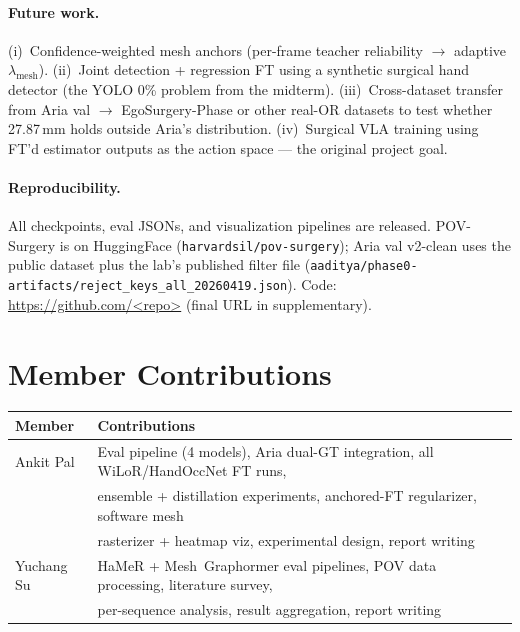 \documentclass{article}
\begin{document}
\paragraph{Future work.}
(i)~Confidence-weighted mesh anchors (per-frame teacher reliability $\to$ adaptive $\lambda_{\text{mesh}}$). (ii)~Joint detection + regression FT using a synthetic surgical hand detector (the YOLO 0\% problem from the midterm). (iii)~Cross-dataset transfer from Aria val $\to$ EgoSurgery-Phase or other real-OR datasets to test whether 27.87\,mm holds outside Aria's distribution. (iv)~Surgical VLA training using FT'd estimator outputs as the action space — the original project goal.

\paragraph{Reproducibility.}
All checkpoints, eval JSONs, and visualization pipelines are released. POV-Surgery is on HuggingFace (\texttt{harvardsil/pov-surgery}); Aria val v2-clean uses the public dataset plus the lab's published filter file (\texttt{aaditya/phase0-artifacts/reject\_keys\_all\_20260419.json}). Code: \url{https://github.com/<repo>} (final URL in supplementary).

\section*{Member Contributions}

\begin{table}[h]
\centering
\small
\begin{tabular}{ll}
\toprule
\textbf{Member} & \textbf{Contributions} \\
\midrule
Ankit Pal  & Eval pipeline (4 models), Aria dual-GT integration, all WiLoR/HandOccNet FT runs, \\
            & ensemble + distillation experiments, anchored-FT regularizer, software mesh \\
            & rasterizer + heatmap viz, experimental design, report writing \\
Yuchang Su  & HaMeR + Mesh~Graphormer eval pipelines, POV data processing, literature survey, \\
            & per-sequence analysis, result aggregation, report writing \\
\bottomrule
\end{tabular}
\end{table}
\end{document}
